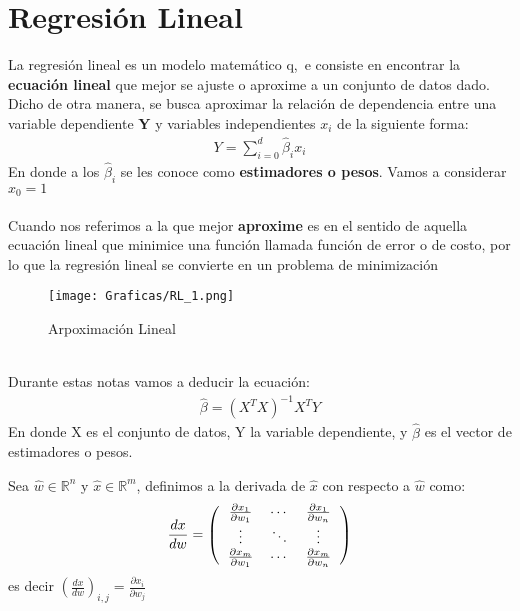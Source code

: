 \documentclass[12pt,a4paper]{book}
\begin{document}
\chapter{Regresión Lineal}
La regresión lineal es un modelo matemático q,~e consiste en encontrar la \textbf{ecuación lineal} que mejor se ajuste o aproxime a un conjunto de datos dado. Dicho de otra manera, se busca aproximar la relación de dependencia entre una variable dependiente  \textbf{Y}  y variables independientes  $x_{i}$  de la siguiente forma:
\begin{equation*}
\begin{split}
Y=\sum^{d}_{i=0}\widehat{\beta}_{i}x_{i}
\end{split}
\end{equation*}
En donde a los $\widehat{\beta}_{i}$ se les conoce como \textbf{estimadores o pesos}. Vamos a considerar $x_{0}=1$\\
\\
Cuando nos referimos a la que mejor \textbf{aproxime} es en el sentido de aquella ecuación lineal que minimice una función llamada función de error o de costo, por lo que la regresión lineal se convierte en un problema de minimización
\begin{figure}[hbtp]
\centering
\texttt{[image: Graficas/RL\_1.png]}
\caption{Arpoximación Lineal}
\end{figure}
\\
Durante estas notas vamos a deducir la ecuación:
\begin{equation*}
\begin{split}
\widehat{\beta}=(X^{T}X)^{-1}X^{T}Y
\end{split}
\end{equation*}
En donde X es el conjunto de datos, Y la variable dependiente, y $\widehat{\beta}$ es el vector de estimadores o pesos.
\begin{definicion}{}{}
Sea $\widehat{w}\in\mathbb{R}^{n}$ y $\widehat{x}\in\mathbb{R}^{m}$, definimos a la derivada de $\widehat{x}$ con respecto a $\widehat{w}$ como:
\begin{equation*}
\begin{split}
\frac{dx}{dw}=\left(
\begin{tabular}{ccc}
$\frac{\partial x_{1}}{\partial w_{1}}$ & $\cdots$ & $\frac{\partial x_{1}}{\partial w_{n}}$ \\ 
$\vdots$ & $\ddots$ & $\vdots$ \\ 
$\frac{\partial x_{m}}{\partial w_{1}}$ & $\cdots$ & $\frac{\partial x_{m}}{\partial w_{n}}$ \\ 
\end{tabular} 
\right)
\end{split}
\end{equation*}
es decir $\left( \frac{dx}{dw} \right)_{i,j}=\frac{\partial x_{i}}{\partial w_{j}}$
\end{definicion}
\end{document}
